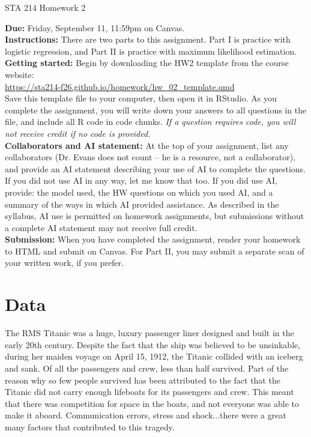 \documentclass[11pt]{article}
\begin{document}
\begin{center}
\Large
STA 214 Homework 2\\
\normalsize
\vspace{5mm}
\end{center}

\noindent \textbf{Due:} Friday, September 11, 11:59pm on Canvas.\\ 

\noindent \textbf{Instructions:} There are two parts to this assignment. Part I is practice with logistic regression,  and Part II is practice with maximum likelihood estimation.\\

\noindent \textbf{Getting started:} Begin by downloading the HW2 template from the course website:\\

\url{https://sta214-f26.github.io/homework/hw_02_template.qmd}\\

\noindent Save this template file to your computer, then open it in RStudio. As you complete the assignment, you will write down your answers to all questions in the file, and include all R code in code chunks. \textit{If a question requires code, you will not receive credit if no code is provided.}\\

\noindent \textbf{Collaborators and AI statement:} At the top of your assignment, list any collaborators (Dr. Evans does not count -- he is a resource, not a collaborator), and provide an AI statement describing your use of AI to complete the questions. If you did not use AI in any way, let me know that too. If you did use AI, provide: the model used, the HW questions on which you used AI, and a summary of the ways in which AI provided assistance. As described in the syllabus, AI use is permitted on homework assignments, but submissions without a complete AI statement may not receive full credit.\\

\noindent \textbf{Submission:} When you have completed the assignment, render your homework to HTML and submit on Canvas. For Part II, you may submit a separate scan of your written work, if you prefer.

\section*{Data}

The RMS Titanic was a huge, luxury passenger liner designed and built in the early 20th century. Despite the fact that the ship was believed to be unsinkable, during her maiden voyage on April 15, 1912, the Titanic collided with an iceberg and sank. Of all the passengers and crew, less than half survived. Part of the reason why so few people survived has been attributed to the fact that the Titanic did not carry enough lifeboats for its passengers and crew. This meant that there was competition for space in the boats, and not everyone was able to make it aboard. Communication errors, stress and shock...there were a great many factors that contributed to this tragedy.\\
\end{document}
